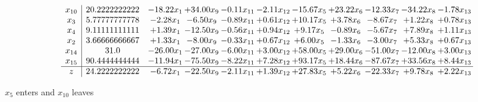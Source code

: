 \documentclass[9pt]{article}
\begin{document}
 \[\begin{array}{c| c c@{\hskip 2pt} c@{\hskip 2pt} c@{\hskip 2pt} c@{\hskip 2pt} c@{\hskip 2pt} c@{\hskip 2pt} c@{\hskip 2pt} c@{\hskip 2pt} c@{\hskip 2pt} }
 x_{10}   &  20.2222222222 & -18.22 x_{1} & + 34.00 x_{9} & -0.11 x_{11} & -2.11 x_{12} & -15.67 x_{5} & + 23.22 x_{6} & -12.33 x_{7} & -34.22 x_{8} & -1.78 x_{13}\\
 x_{3}   &  5.77777777778 & -2.28 x_{1} & -6.50 x_{9} & -0.89 x_{11} & +  0.61 x_{12} & + 10.17 x_{5} & +  3.78 x_{6} & -8.67 x_{7} & +  1.22 x_{8} & +  0.78 x_{13}\\
 x_{4}   &  9.11111111111 & +  1.39 x_{1} & -12.50 x_{9} & -0.56 x_{11} & +  0.94 x_{12} & +  9.17 x_{5} & -0.89 x_{6} & -5.67 x_{7} & +  7.89 x_{8} & +  1.11 x_{13}\\
 x_{2}   &  3.66666666667 & +  1.33 x_{1} & -8.00 x_{9} & -0.33 x_{11} & +  0.67 x_{12} & +  6.00 x_{5} & -1.33 x_{6} & -3.00 x_{7} & +  5.33 x_{8} & +  0.67 x_{13}\\
 x_{14}   &  31.0 & -26.00 x_{1} & -27.00 x_{9} & -6.00 x_{11} & +  3.00 x_{12} & + 58.00 x_{5} & + 29.00 x_{6} & -51.00 x_{7} & -12.00 x_{8} & +  3.00 x_{13}\\
 x_{15}   &  90.4444444444 & -11.94 x_{1} & -75.50 x_{9} & -8.22 x_{11} & +  7.28 x_{12} & + 93.17 x_{5} & + 18.44 x_{6} & -87.67 x_{7} & + 33.56 x_{8} & +  8.44 x_{13}\\
\hline
z    &  24.2222222222 & -6.72 x_{1} & -22.50 x_{9} & -2.11 x_{11} & +  1.39 x_{12} & + 27.83 x_{5} & +  5.22 x_{6} & -22.33 x_{7} & +  9.78 x_{8} & +  2.22 x_{13}\\
\end{array}\]


 $ x_{5} $ enters and $ x_{10} $ leaves 
\end{document}
